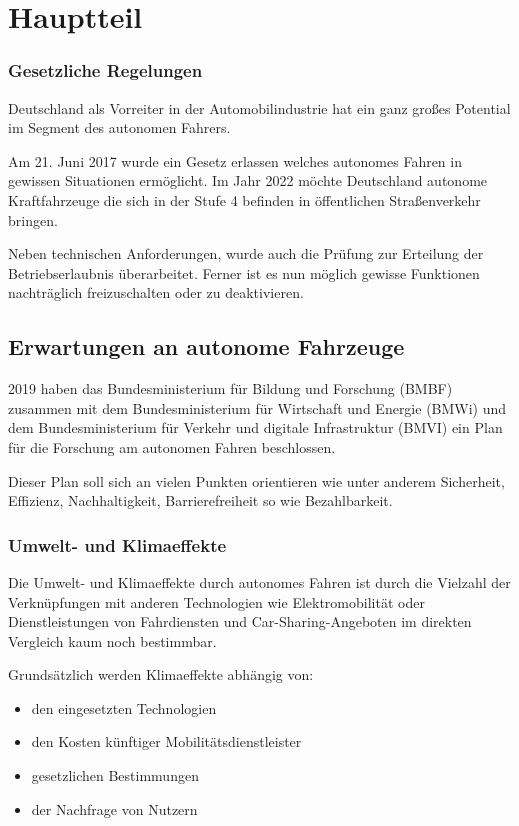 \chapter{Hauptteil}



\subsection{Gesetzliche Regelungen}
Deutschland als Vorreiter in der Automobilindustrie hat ein ganz großes Potential im Segment des autonomen Fahrers.

Am 21. Juni 2017 wurde ein Gesetz erlassen welches autonomes Fahren in gewissen Situationen ermöglicht.
Im Jahr 2022 möchte Deutschland autonome Kraftfahrzeuge die sich in der Stufe 4 befinden in öffentlichen Straßenverkehr bringen.

Neben technischen Anforderungen, wurde auch die Prüfung zur Erteilung der Betriebserlaubnis überarbeitet.
Ferner ist es nun möglich gewisse Funktionen nachträglich freizuschalten oder zu deaktivieren.



\section{Erwartungen an autonome Fahrzeuge}
2019 haben das
Bundesministerium für Bildung und Forschung (BMBF) zusammen mit dem
Bundesministerium für Wirtschaft und Energie (BMWi) und dem
Bundesministerium für Verkehr und digitale Infrastruktur (BMVI)
ein Plan für die Forschung am autonomen Fahren beschlossen.

Dieser Plan soll sich an vielen Punkten orientieren wie unter anderem Sicherheit, Effizienz, Nachhaltigkeit, Barrierefreiheit so wie Bezahlbarkeit.

\subsection{Umwelt- und Klimaeffekte}
Die Umwelt- und Klimaeffekte durch autonomes Fahren ist durch die Vielzahl der Verknüpfungen mit anderen Technologien wie Elektromobilität
oder Dienstleistungen von Fahrdiensten und Car-Sharing-Angeboten im direkten Vergleich kaum noch bestimmbar.

Grundsätzlich werden Klimaeffekte abhängig von:
\begin{itemize}
	\item den eingesetzten Technologien
	\item den Kosten künftiger Mobilitätsdienstleister
	\item gesetzlichen Bestimmungen
	\item der Nachfrage von Nutzern
\end{itemize}

